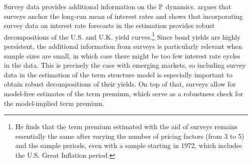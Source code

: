 {Survey data provides additional information on the \(\mathbb{P}\) dynamics.
\cite{Guimaraes:2014} argues that surveys anchor the long-run mean of interest rates and shows that incorporating survey data on interest rate forecasts in the estimation provides robust decompositions of the U.S. and U.K. yield curves.\footnote{ He finds that the term premium estimated with the aid of surveys remains essentially the same after varying the number of pricing factors (from 3 to 5) and the sample periods, even with a sample starting in 1972, which includes the U.S. Great Inflation period.} 
Since bond yields are highly persistent, the additional information from surveys is particularly relevant %
when sample sizes are small, in which case there might be too few interest rate cycles in the data.
This is precisely the case with emerging markets, so including survey data in the estimation of the term structure model is especially important to obtain robust decompositions of their yields. %
On top of that,
surveys allow for model-free estimates of the term premium, which
serve as a robustness check for the model-implied term premium.


}
